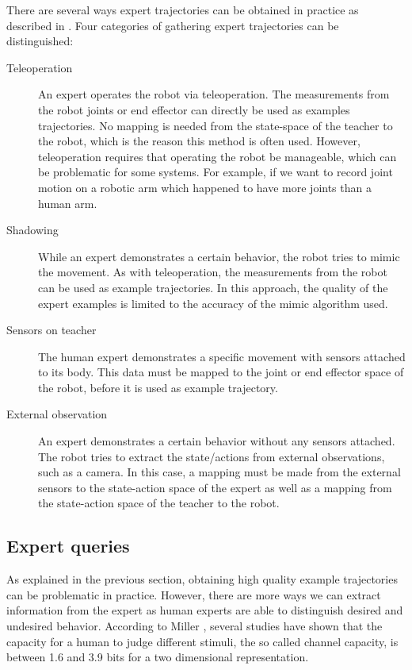\documentclass[mscThesis.tex]{subfiles}
\begin{document}
There are several ways expert trajectories can be obtained in practice as described in \cite{Argall2009}. Four categories of gathering expert trajectories can be distinguished:

\begin{description}
\item [Teleoperation] An expert operates the robot via teleoperation. The measurements from the robot joints or end effector can directly be used as examples trajectories. No mapping is needed from the state-space of the teacher to the robot, which is the reason this method is often used. However, teleoperation requires that
operating the robot be manageable, which can be problematic for some systems. For example, if we want to record joint motion on a robotic arm which happened to have more joints than a human arm.
\item [Shadowing] While an expert demonstrates a certain behavior, the robot tries to mimic the movement. As with teleoperation, the measurements from the robot can be used as example trajectories. In this approach, the quality of the expert examples is limited to the accuracy of the mimic algorithm used. 
\item [Sensors on teacher] The human expert demonstrates a specific movement with sensors attached to its body. This data must be mapped to the joint or end effector space of the robot, before it is used as example trajectory. 
\item [External observation] An expert demonstrates a certain behavior without any sensors attached. The robot tries to extract the state/actions from external observations, such as a camera. In this case, a mapping must be made from the external sensors to the state-action space of the expert as well as a mapping from the state-action space of the teacher to the robot. 
\end{description}

\subsection{Expert queries}
As explained in the previous section, obtaining high quality example trajectories can be problematic in practice. However, there are more ways we can extract information from the expert as human experts are able to distinguish desired and undesired behavior. According to Miller \cite{miller1956magical}, several studies have shown that the capacity for a human to judge different stimuli, the so called channel capacity, is between 1.6 and 3.9 bits for a two dimensional representation. 
\end{document}
